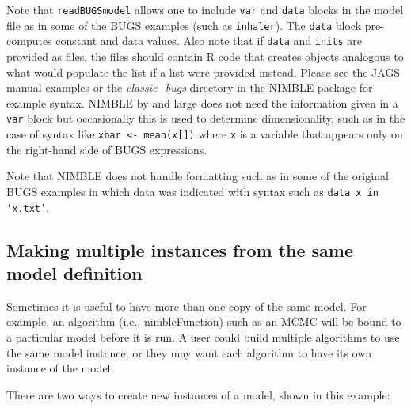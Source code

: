 \documentclass[12pt,oneside]{book}\usepackage[]{graphicx}\usepackage[]{color}
\def\file#1{\textsl{#1}}
\def\cd#1{\texttt{#1}}
\begin{document}
Note that \cd{readBUGSmodel} allows one to include \cd{var} and \cd{data} blocks in the model file as in some of the BUGS examples (such as \cd{inhaler}). The \cd{data} block pre-computes constant and data values. Also note that if  \cd{data} and \cd{inits} are provided
as files, the files should contain R code that creates objects
analogous to what would populate the list if a list were provided
instead.  Please see the JAGS manual examples or the
\file{classic\_bugs} directory in the NIMBLE package for example
syntax. 
NIMBLE by and large does not need the information given in a \cd{var}
block but occasionally this is used to determine dimensionality, such
as in the case of syntax like \cd{xbar <- mean(x[])} where \cd{x} is a variable that appears only on the right-hand side of BUGS expressions.   

Note that NIMBLE does not handle formatting such as in some of the
original BUGS examples in which data was indicated with syntax such as
\cd{data x in `x.txt'}.

\subsection{Making multiple instances from the same model definition}
\label{sub:multiple-instances}
  
Sometimes it is useful to have more than one copy of the same model.
For example, an algorithm (i.e., nimbleFunction) such as an MCMC will be
bound to a particular model before it is run.  A user could build multiple algorithms
to use the same model instance, or they may want each algorithm to
have its own instance of the model.

There are two ways to create new instances of a model, shown in this example:
\end{document}

